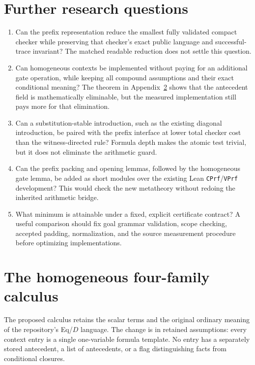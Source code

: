 \documentclass[11pt]{article}
\theoremstyle{definition}\newtheorem{definition}[theorem]{Definition}
\theoremstyle{remark}\newtheorem{remark}[theorem]{Remark}
\newcommand{\code}[1]{\texttt{#1}}
\begin{document}
\section{Further research questions}

\begin{enumerate}
\item Can the prefix representation reduce the smallest fully validated
compact checker while preserving that checker's exact public language and
successful-trace invariant? The matched readable reduction does not
settle this question.
\item Can homogeneous contexts be implemented without paying for an
additional gate operation, while keeping all compound assumptions and
their exact conditional meaning? The theorem in Appendix~\ref{sec:homogeneous}
shows that the antecedent field is mathematically eliminable, but the
measured implementation still pays more for that elimination.
\item Can a substitution-stable introduction, such as the existing
diagonal introduction, be paired with the prefix interface at lower total
checker cost than the witness-directed rule? Formula depth makes the
atomic test trivial, but it does not eliminate the arithmetic guard.
\item Can the prefix packing and opening lemmas, followed by the
homogeneous gate lemma, be added as short modules over the existing Lean
\code{CPrf}/\code{VPrf} development? This would check the new metatheory
without redoing the inherited arithmetic bridge.
\item What minimum is attainable under a fixed, explicit certificate
contract? A useful comparison should fix goal grammar validation, scope
checking, accepted padding, normalization, and the source measurement
procedure before optimizing implementations.
\end{enumerate}

\clearpage
\appendix
\section{The homogeneous four-family calculus}
\label{sec:homogeneous}

The proposed calculus retains the scalar terms and the original ordinary
meaning of the repository's Eq/$D$ language.  The change is in retained
assumptions: every context entry is a single one-variable formula
template.  No entry has a separately stored antecedent, a list of
antecedents, or a flag distinguishing facts from conditional closures.
\end{document}

